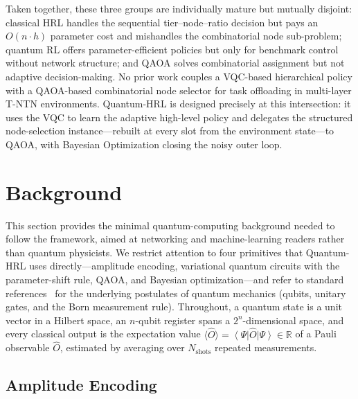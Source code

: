 \documentclass[11pt,a4paper]{article}
\theoremstyle{definition}
\newcommand{\R}{\mathbb{R}}
\newcommand{\ket}[1]{\left\lvert #1 \right\rangle}
\newcommand{\bra}[1]{\left\langle #1 \right\rvert}
\begin{document}
\medskip
\noindent Taken together, these three groups are individually mature but mutually disjoint: classical HRL handles the sequential tier--node--ratio decision but pays an $O(n\cdot h)$ parameter cost and mishandles the combinatorial node sub-problem; quantum RL offers parameter-efficient policies but only for benchmark control without network structure; and QAOA solves combinatorial assignment but not adaptive decision-making. No prior work couples a VQC-based hierarchical policy with a QAOA-based combinatorial node selector for task offloading in multi-layer T-NTN environments. Quantum-HRL is designed precisely at this intersection: it uses the VQC to learn the adaptive high-level policy and delegates the structured node-selection instance---rebuilt at every slot from the environment state---to QAOA, with Bayesian Optimization closing the noisy outer loop.

\section{Background}
\label{sec:background}

This section provides the minimal quantum-computing background needed to follow the framework, aimed at networking and machine-learning readers rather than quantum physicists. We restrict attention to four primitives that Quantum-HRL uses directly---amplitude encoding, variational quantum circuits with the parameter-shift rule, QAOA, and Bayesian optimization---and refer to standard references~\cite{yanofsky2007intro,nielsen2010quantum} for the underlying postulates of quantum mechanics (qubits, unitary gates, and the Born measurement rule). Throughout, a quantum state is a unit vector in a Hilbert space, an $n$-qubit register spans a $2^n$-dimensional space, and every classical output is the expectation value $\langle\hat O\rangle=\bra{\Psi}\hat O\ket{\Psi}\in\R$ of a Pauli observable $\hat O$, estimated by averaging over $N_{\mathrm{shots}}$ repeated measurements.

\subsection{Amplitude Encoding}
\label{subsec:bg_amp}
\end{document}
